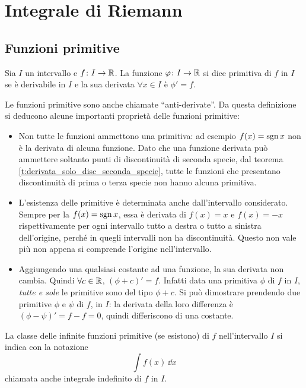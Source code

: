 \chapter{Integrale di Riemann}
	\label{ch:integrale-riemann}
\section{Funzioni primitive}
\begin{definizione} \label{d:primitiva}
Sia $I$ un intervallo e $f\colon I\to\mathbb{R}$. La funzione $\varphi\colon I\to\mathbb{R}$ si dice primitiva di $f$ in $I$ se è derivabile in $I$ e la sua derivata $\forall x\in I$ è $\phi'=f$.
\end{definizione}
Le funzioni primitive sono anche chiamate ``anti-derivate''. Da questa definizione si deducono alcune importanti proprietà delle funzioni primitive:
\begin{itemize}
\item Non tutte le funzioni ammettono una primitiva: ad esempio $f(x)=\operatorname{sgn} x$ non è la derivata di alcuna funzione. Dato che una funzione derivata può ammettere soltanto punti di discontinuità di seconda specie, dal teorema \ref{t:derivata_solo_disc_seconda_specie}, tutte le funzioni che presentano discontinuità di prima o terza specie non hanno alcuna primitiva.
\item L'esistenza delle primitive è determinata anche dall'intervallo considerato. Sempre per la $f(x)=\operatorname{sgn} x$, essa è derivata di $f(x)=x$ e $f(x)=-x$ rispettivamente per ogni intervallo tutto a destra o tutto a sinistra dell'origine, perché in quegli intervalli non ha discontinuità. Questo non vale più non appena si comprende l'origine nell'intervallo.
\item Aggiungendo una qualsiasi costante ad una funzione, la sua derivata non cambia. Quindi $\forall c\in\mathbb{R}$, $(\phi+c)'=f$. Infatti data una primitiva $\phi$ di $f$ in $I$, \emph{tutte e sole} le primitive sono del tipo $\phi+c$. Si può dimostrare prendendo due primitive $\phi$ e $\psi$ di $f$, in $I$: la derivata della loro differenza è $(\phi-\psi)'=f-f=0$, quindi differiscono di una costante.
\end{itemize}
La classe delle infinite funzioni primitive (se esistono) di $f$ nell'intervallo $I$ si indica con la notazione
\[
\int f(x)\,\dd x
\]
chiamata anche integrale indefinito di $f$ in $I$.

